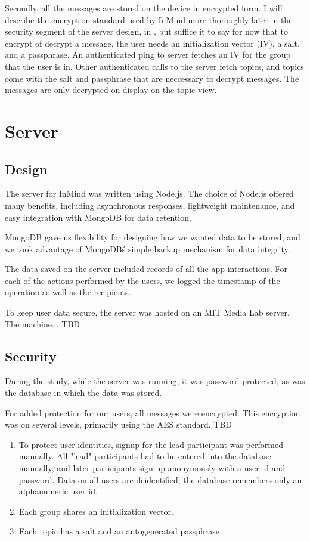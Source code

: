       Secondly, all the messages are stored on the device in encrypted form.
      I will describe the encryption standard used by InMind more thoroughly
      later in the security segment of the server design, in \cite{},
      but suffice it to say for now that to encrypt of decrypt a message, 
      the user needs an initialization vector (IV),
      a salt, and a passphrase.
      An authenticated ping to server fetches an IV for the group that the user is in.
      Other authenticated calls to the server fetch topics,
      and topics come with the salt and passphrase that are neccessary to decrypt messages.
      The messages are only decrypted on display on the topic view.

  \section{Server}
    \subsection{Design}
      The server for InMind was written using Node.js.
      The choice of Node.js offered many benefits, including asynchronous responses,
      lightweight maintenance, and easy integration with MongoDB for data retention.

      MongoDB gave us flexibility for designing how we wanted data to be stored,
      and we took advantage of MongoDB\'s simple backup mechanism for data integrity.

      The data saved on the server included records of all the app interactions.
      For each of the actions performed by the users,
      we logged the timestamp of the operation as well as the recipients.

      To keep user data secure, the server was hosted on an MIT Media Lab server.
      The machine... TBD

    \subsection{Security}
      During the study, while the server was running, it was password protected,
      as was the database in which the data was stored.

      For added protection for our users, all messages were encrypted.
      This encryption was on several levels, primarily using the AES standard.
      TBD

      \begin{enumerate}
      \item To protect user identities, signup for the lead participant was performed manually.
      All "lead" participants had to be entered into the database manually,
      and later participants sign up anonymously with a user id and password.
      Data on all users are deidentified;
      the database remembers only an alphanumeric user id.
      \item Each group shares an initialization vector.
      \item Each topic has a salt and an autogenerated passphrase.
      \end{enumerate}

